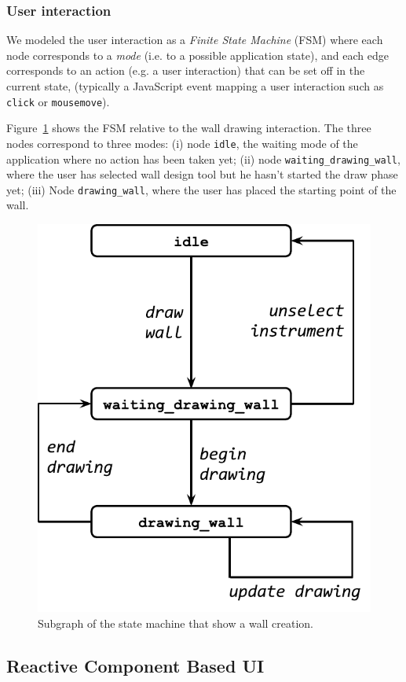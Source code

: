 \subsubsection*{User interaction} We modeled the user interaction as a \emph{Finite State Machine} (FSM) where each node corresponds to a \emph{mode} (i.e. to a possible application state), and each edge corresponds to an action (e.g. a user interaction) that can be set off in the current state, (typically a JavaScript event mapping a user interaction such as \texttt{click} or \texttt{mousemove}). 

Figure~\ref{fig_uc_draw_wall} shows the FSM relative to the wall drawing interaction. The three nodes correspond to three modes: (i) node \texttt{idle}, the waiting mode of the application where no action has been taken yet; (ii) node \texttt{waiting\_drawing\_wall}, where the user has selected wall design tool but he hasn't started the draw phase yet; (iii) Node \texttt{drawing\_wall}, where the user has placed the starting point of the wall.


\begin{figure}[!t]
\centering
\includegraphics[width=0.6\linewidth]{contents/images/uc_draw_wall}

\caption{Subgraph of the state machine that show a wall creation.}
\label{fig_uc_draw_wall}
\end{figure}



\subsection{Reactive Component Based UI}

